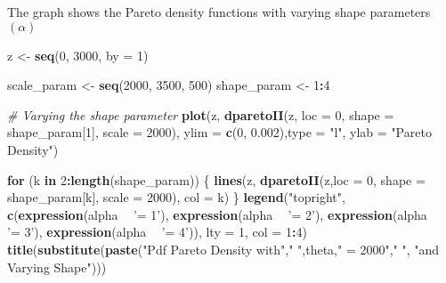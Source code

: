 \documentclass[]{book}
\newenvironment{Shaded}{\begin{snugshade}}{\end{snugshade}}
\newcommand{\KeywordTok}[1]{\textcolor[rgb]{0.13,0.29,0.53}{\textbf{#1}}}
\newcommand{\DataTypeTok}[1]{\textcolor[rgb]{0.13,0.29,0.53}{#1}}
\newcommand{\DecValTok}[1]{\textcolor[rgb]{0.00,0.00,0.81}{#1}}
\newcommand{\FloatTok}[1]{\textcolor[rgb]{0.00,0.00,0.81}{#1}}
\newcommand{\StringTok}[1]{\textcolor[rgb]{0.31,0.60,0.02}{#1}}
\newcommand{\CommentTok}[1]{\textcolor[rgb]{0.56,0.35,0.01}{\textit{#1}}}
\newcommand{\ControlFlowTok}[1]{\textcolor[rgb]{0.13,0.29,0.53}{\textbf{#1}}}
\newcommand{\OperatorTok}[1]{\textcolor[rgb]{0.81,0.36,0.00}{\textbf{#1}}}
\newcommand{\NormalTok}[1]{#1}
\theoremstyle{definition}
\theoremstyle{definition}
\theoremstyle{definition}
\theoremstyle{remark}
\begin{document}
The graph shows the Pareto density functions with varying shape
parameters \((\alpha)\)

\begin{Shaded}
\begin{Highlighting}[]
\NormalTok{z <-}\StringTok{ }\KeywordTok{seq}\NormalTok{(}\DecValTok{0}\NormalTok{, }\DecValTok{3000}\NormalTok{, }\DataTypeTok{by =} \DecValTok{1}\NormalTok{)}

\NormalTok{scale_param <-}\StringTok{ }\KeywordTok{seq}\NormalTok{(}\DecValTok{2000}\NormalTok{, }\DecValTok{3500}\NormalTok{, }\DecValTok{500}\NormalTok{)}
\NormalTok{shape_param <-}\StringTok{ }\DecValTok{1}\OperatorTok{:}\DecValTok{4}

\CommentTok{# Varying the shape parameter}
\KeywordTok{plot}\NormalTok{(z, }\KeywordTok{dparetoII}\NormalTok{(z, }\DataTypeTok{loc =} \DecValTok{0}\NormalTok{, }\DataTypeTok{shape =}\NormalTok{ shape_param[}\DecValTok{1}\NormalTok{], }\DataTypeTok{scale =} \DecValTok{2000}\NormalTok{), }
     \DataTypeTok{ylim =} \KeywordTok{c}\NormalTok{(}\DecValTok{0}\NormalTok{, }\FloatTok{0.002}\NormalTok{),}\DataTypeTok{type =} \StringTok{"l"}\NormalTok{, }\DataTypeTok{ylab =} \StringTok{"Pareto Density"}\NormalTok{)}

\ControlFlowTok{for}\NormalTok{ (k }\ControlFlowTok{in} \DecValTok{2}\OperatorTok{:}\KeywordTok{length}\NormalTok{(shape_param)) \{}
  \KeywordTok{lines}\NormalTok{(z, }\KeywordTok{dparetoII}\NormalTok{(z,}\DataTypeTok{loc =} \DecValTok{0}\NormalTok{, }\DataTypeTok{shape =}\NormalTok{ shape_param[k], }\DataTypeTok{scale =} \DecValTok{2000}\NormalTok{), }\DataTypeTok{col =}\NormalTok{ k)}
\NormalTok{\}}
\KeywordTok{legend}\NormalTok{(}\StringTok{"topright"}\NormalTok{, }\KeywordTok{c}\NormalTok{(}\KeywordTok{expression}\NormalTok{(alpha }\OperatorTok{~}\StringTok{ '= 1'}\NormalTok{), }\KeywordTok{expression}\NormalTok{(alpha }\OperatorTok{~}\StringTok{ '= 2'}\NormalTok{), }
                     \KeywordTok{expression}\NormalTok{(alpha }\OperatorTok{~}\StringTok{ '= 3'}\NormalTok{), }\KeywordTok{expression}\NormalTok{(alpha }\OperatorTok{~}\StringTok{ '= 4'}\NormalTok{)), }
       \DataTypeTok{lty =} \DecValTok{1}\NormalTok{, }\DataTypeTok{col =} \DecValTok{1}\OperatorTok{:}\DecValTok{4}\NormalTok{)}
\KeywordTok{title}\NormalTok{(}\KeywordTok{substitute}\NormalTok{(}\KeywordTok{paste}\NormalTok{(}\StringTok{"Pdf Pareto Density with"}\NormalTok{,}\StringTok{" "}\NormalTok{,theta,}\StringTok{" = 2000"}\NormalTok{,}\StringTok{" "}\NormalTok{, }
                       \StringTok{"and Varying Shape"}\NormalTok{)))}
\end{Highlighting}
\end{Shaded}
\end{document}
